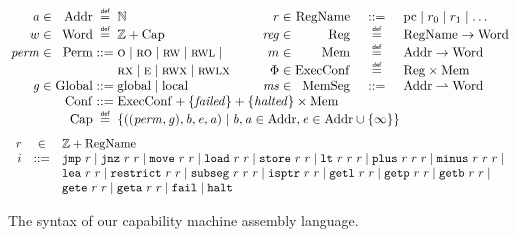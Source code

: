 \documentclass[format=acmsmall, review=true, screen=true]{acmart}
\newcommand{\parfun}{\rightharpoonup}
\newcommand{\var}[1]{\mathit{#1}}
\newcommand{\hs}{\var{ms}}
\newcommand{\ms}{\hs}
\newcommand{\hv}{\var{r}}
\newcommand{\rv}{\var{r}}
\newcommand{\lv}{\var{r}}
\newcommand{\gl}{\var{g}}
\newcommand{\pcreg}{\mathrm{pc}}
\newcommand{\addr}{\var{a}}
\newcommand{\start}{\var{b}}
\newcommand{\addrend}{\var{e}}
\newcommand{\reg}{\var{reg}}
\newcommand{\perm}{\var{perm}}
\newcommand{\failed}{\mathit{failed}}
\newcommand{\halted}{\mathit{halted}}
\newcommand{\plaindom}[1]{\mathrm{#1}}
\newcommand{\Caps}{\plaindom{Cap}}
\newcommand{\Words}{\plaindom{Word}}
\newcommand{\Addrs}{\plaindom{Addr}}
\newcommand{\ExecConfs}{\plaindom{ExecConf}}
\newcommand{\RegName}{\plaindom{RegName}}
\newcommand{\Regs}{\plaindom{Reg}}
\newcommand{\Heaps}{\plaindom{Mem}}
\newcommand{\HeapSegments}{\plaindom{MemSeg}}
\newcommand{\MemSegments}{\HeapSegments}
\newcommand{\Confs}{\plaindom{Conf}}
\newcommand{\nats}{\mathbb{N}}
\newcommand{\ints}{\mathbb{Z}}
\newcommand{\Perms}{\plaindom{Perm}}
\newcommand{\Globals}{\plaindom{Global}}
\newcommand{\zinstr}[1]{\mathtt{#1}}
\newcommand{\fail}{\zinstr{fail}}
\newcommand{\halt}{\zinstr{halt}}
\newcommand{\oneinstr}[2]{
  \ifthenelse{\equal{#2}{}}
  {\zinstr{#1}}
  {\zinstr{#1} \; #2}
}
\newcommand{\jmp}[1]{\oneinstr{jmp}{#1}}
\newcommand{\twoinstr}[3]{
  \ifthenelse{\equal{#2#3}{}}
  {\zinstr{#1}}
  {\zinstr{#1} \; #2 \; #3}
}
\newcommand{\restricttwo}[2]{\twoinstr{restrict}{#1}{#2}}
\newcommand{\jnz}[2]{\twoinstr{jnz}{#1}{#2}}
\newcommand{\isptr}[2]{\twoinstr{isptr}{#1}{#2}}
\newcommand{\geta}[2]{\twoinstr{geta}{#1}{#2}}
\newcommand{\getb}[2]{\twoinstr{getb}{#1}{#2}}
\newcommand{\gete}[2]{\twoinstr{gete}{#1}{#2}}
\newcommand{\getp}[2]{\twoinstr{getp}{#1}{#2}}
\newcommand{\getl}[2]{\twoinstr{getl}{#1}{#2}}
\newcommand{\move}[2]{\twoinstr{move}{#1}{#2}}
\newcommand{\store}[2]{\twoinstr{store}{#1}{#2}}
\newcommand{\load}[2]{\twoinstr{load}{#1}{#2}}
\newcommand{\lea}[2]{\twoinstr{lea}{#1}{#2}}
\newcommand{\threeinstr}[4]{
  \ifthenelse{\equal{#2#3#4}{}}
  {\zinstr{#1}}
  {\zinstr{#1} \; #2 \; #3 \; #4}
}
\newcommand{\subseg}[3]{\threeinstr{subseg}{#1}{#2}{#3}}
\newcommand{\plus}[3]{\threeinstr{plus}{#1}{#2}{#3}}
\newcommand{\minus}[3]{\threeinstr{minus}{#1}{#2}{#3}}
\newcommand{\lt}[3]{\threeinstr{lt}{#1}{#2}{#3}}
\newcommand{\plainperm}[1]{\textsc{#1}}
\newcommand{\noperm}{\plainperm{o}}
\newcommand{\readonly}{\plainperm{ro}}
\newcommand{\readwrite}{\plainperm{rw}}
\newcommand{\exec}{\plainperm{rx}}
\newcommand{\entry}{\plainperm{e}}
\newcommand{\rwx}{\plainperm{rwx}}
\newcommand{\readwritel}{\plainperm{rwl}}
\newcommand{\rwlx}{\plainperm{rwlx}}
\newcommand{\plainlocality}[1]{\mathrm{#1}}
\newcommand{\local}{\plainlocality{local}}
\newcommand{\glob}{\plainlocality{global}}
\newcommand{\isdef}{\mathrel{\overset{\makebox[0pt]{\mbox{\normalfont\tiny\sffamily def}}}{=}}}
\newcommand\bnfdef{\mathrel{::=}}
\begin{document}
\begin{figure}[b]
\[\arraycolsep=1.4pt
  \begin{array}{rlrcl l rlrcl}
    \addr   &\in& \Addrs &\isdef& \nats &\phantom{mak}                                & r    &\in & \RegName     &\bnfdef& \pcreg\mid r_0\mid r_1\mid\ldots\\
    w &\in&\Words &\isdef& \ints + \Caps &                                                   & \reg &\in & \Regs        &\isdef& \RegName \rightarrow \Words \\
    \perm   &\in& \Perms &::= & \noperm \mid \readonly\mid \readwrite\mid \readwritel\mid  & & m    &\in & \Heaps       &\isdef& \Addrs \rightarrow \Words \\
    & & & &\exec\mid \entry\mid \rwx\mid \rwlx &                                             & \Phi &\in & \ExecConfs   &\isdef& \Regs \times \Heaps \\
    \gl&\in&\Globals & ::= &\glob \mid \local &                                              & \ms  &\in & \MemSegments &::= & \Addrs \parfun \Words \\
    &&\Confs &::=& \multicolumn{6}{l}{\ExecConfs + \{\failed \} + \{\halted\} \times \Heaps}\\
     && \Caps  &\isdef & \multicolumn{6}{l}{\left\{
                         ((\perm,\gl),\start,\addrend,\addr)\mid
                         \start,\addr\in\Addrs,\addrend \in
                         \Addrs\cup \{\infty\}\right\}}
  \end{array}
\]
  \begin{equation*}
  \begin{array}{rcl}
    \rv    &\in& \ints + \RegName \\
    i      &::=& 
                 \jmp{\lv} \mid 
                 \jnz{\lv}{\rv} \mid
                 \move{\lv}{\rv} \mid 
                 \load{\lv}{\hv} \mid 
                 \store{\hv}{\rv} \mid
                 \lt{\lv}{\rv}{\rv} \mid
                 \plus{\lv}{\rv}{\rv} \mid 
                 \minus{\lv}{\rv}{\rv} \mid \\
          &   &  \lea{\lv}{\rv} \mid 
                 \restricttwo{\lv}{\rv} \mid
                 \subseg{\lv}{\rv}{\rv} \mid  
                 \isptr{\lv}{\rv} \mid 
                 \getl{\lv}{\lv} \mid
                 \getp{\lv}{\lv} \mid
                 \getb{\lv}{\lv} \mid\\
          &   &  \gete{\lv}{\lv} \mid 
                 \geta{\lv}{\lv} \mid 
                 \fail \mid
                 \halt 
  \end{array}
\end{equation*}
  \caption{The syntax of our capability machine assembly language.}
  \label{fig:syntax}
\end{figure}
\end{document}
